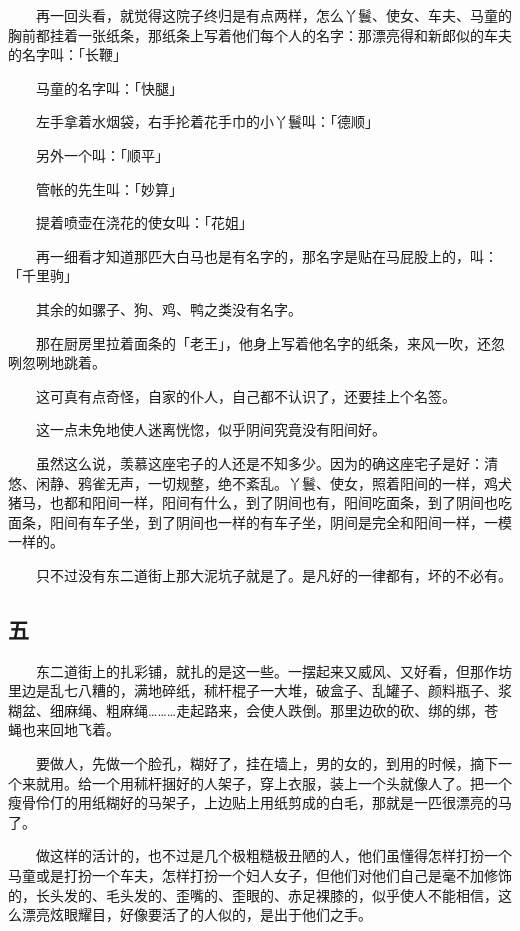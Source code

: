 \documentclass[UTF8]{ctexart}
\begin{document}
　　再一回头看，就觉得这院子终归是有点两样，怎么丫鬟、使女、车夫、马童的胸前都挂着一张纸条，那纸条上写着他们每个人的名字：那漂亮得和新郎似的车夫的名字叫：「长鞭」

　　马童的名字叫：「快腿」

　　左手拿着水烟袋，右手抡着花手巾的小丫鬟叫：「德顺」

　　另外一个叫：「顺平」

　　管帐的先生叫：「妙算」

　　提着喷壶在浇花的使女叫：「花姐」

　　再一细看才知道那匹大白马也是有名字的，那名字是贴在马屁股上的，叫：「千里驹」

　　其余的如骡子、狗、鸡、鸭之类没有名字。

　　那在厨房里拉着面条的「老王」，他身上写着他名字的纸条，来风一吹，还忽咧忽咧地跳着。

　　这可真有点奇怪，自家的仆人，自己都不认识了，还要挂上个名签。

　　这一点未免地使人迷离恍惚，似乎阴间究竟没有阳间好。

　　虽然这么说，羡慕这座宅子的人还是不知多少。因为的确这座宅子是好：清悠、闲静、鸦雀无声，一切规整，绝不紊乱。丫鬟、使女，照着阳间的一样，鸡犬猪马，也都和阳间一样，阳间有什么，到了阴间也有，阳间吃面条，到了阴间也吃面条，阳间有车子坐，到了阴间也一样的有车子坐，阴间是完全和阳间一样，一模一样的。

　　只不过没有东二道街上那大泥坑子就是了。是凡好的一律都有，坏的不必有。

\subsection{五}

　　东二道街上的扎彩铺，就扎的是这一些。一摆起来又威风、又好看，但那作坊里边是乱七八糟的，满地碎纸，秫杆棍子一大堆，破盒子、乱罐子、颜料瓶子、浆糊盆、细麻绳、粗麻绳………走起路来，会使人跌倒。那里边砍的砍、绑的绑，苍蝇也来回地飞着。

　　要做人，先做一个脸孔，糊好了，挂在墙上，男的女的，到用的时候，摘下一个来就用。给一个用秫杆捆好的人架子，穿上衣服，装上一个头就像人了。把一个瘦骨伶仃的用纸糊好的马架子，上边贴上用纸剪成的白毛，那就是一匹很漂亮的马了。

　　做这样的活计的，也不过是几个极粗糙极丑陋的人，他们虽懂得怎样打扮一个马童或是打扮一个车夫，怎样打扮一个妇人女子，但他们对他们自己是毫不加修饰的，长头发的、毛头发的、歪嘴的、歪眼的、赤足裸膝的，似乎使人不能相信，这么漂亮炫眼耀目，好像要活了的人似的，是出于他们之手。
\end{document}
